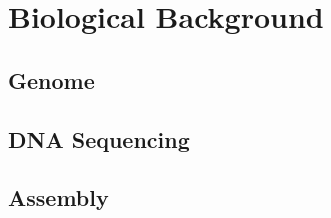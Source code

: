 \section{Biological Background}\label{SECTION:BIOINTRO}

\subsection{Genome}

\subsection{DNA Sequencing}

\subsection{Assembly}


